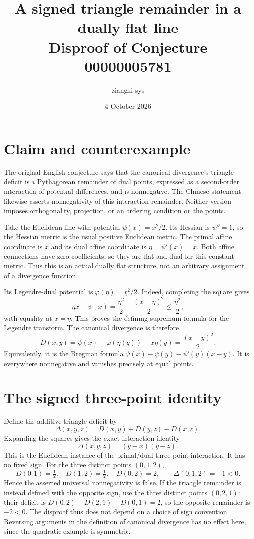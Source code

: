 \documentclass[11pt]{article}
\title{A signed triangle remainder in a dually flat line\\Disproof of Conjecture 00000005781}
\author{ziangni-sys}
\date{4 October 2026}
\begin{document}
\maketitle
\section*{Claim and counterexample}
The original English conjecture says that the canonical divergence's
triangle deficit is a Pythagorean remainder of dual points, expressed as a
second-order interaction of potential differences, and is nonnegative.
The Chinese statement likewise asserts nonnegativity of this interaction
remainder. Neither version imposes orthogonality, projection, or an
ordering condition on the points.

Take the Euclidean line with potential $\psi(x)=x^2/2$.
Its Hessian is $\psi''=1$, so the Hessian metric is the usual positive
Euclidean metric. The primal affine coordinate is $x$ and its dual affine
coordinate is $\eta=\psi'(x)=x$. Both affine connections have zero
coefficients, so they are flat and dual for this constant metric.
Thus this is an actual dually flat structure, not an arbitrary assignment
of a divergence function.

Its Legendre-dual potential is $\varphi(\eta)=\eta^2/2$.
Indeed, completing the square gives
\[
\eta x-\psi(x)=\frac{\eta^2}{2}-\frac{(x-\eta)^2}{2}
\leq\frac{\eta^2}{2},
\]
with equality at $x=\eta$. This proves the defining supremum formula
for the Legendre transform. The canonical divergence is therefore
\[
D(x,y)=\psi(x)+\varphi(\eta(y))-x\eta(y)
=\frac{(x-y)^2}{2}.
\]
Equivalently, it is the Bregman formula
$\psi(x)-\psi(y)-\psi'(y)(x-y)$.
It is everywhere nonnegative and vanishes precisely at equal points.

\newpage
\section*{The signed three-point identity}
Define the additive triangle deficit by
\[
\Delta(x,y,z)=D(x,y)+D(y,z)-D(x,z).
\]
Expanding the squares gives the exact interaction identity
\[
\Delta(x,y,z)=(y-x)(y-z).
\]
This is the Euclidean instance of the primal/dual three-point interaction.
It has no fixed sign. For the three distinct points $(0,1,2)$,
\[
D(0,1)=\tfrac12,\quad D(1,2)=\tfrac12,\quad D(0,2)=2,
\qquad \Delta(0,1,2)=-1<0.
\]
Hence the asserted universal nonnegativity is false.
If the triangle remainder is instead defined with the opposite sign,
use the three distinct points $(0,2,1)$: their deficit is
$D(0,2)+D(2,1)-D(0,1)=2$, so the opposite remainder is $-2<0$.
The disproof thus does not depend on a choice of sign convention.
Reversing arguments in the definition of canonical divergence has no
effect here, since the quadratic example is symmetric.
\end{document}

